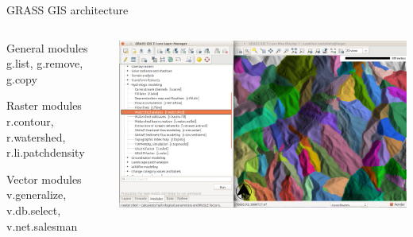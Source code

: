 \documentclass[xcolor={dvipsnames,usenames},beamer,aspectratio=169]{beamer}
\begin{document}
\begin{frame}{GRASS GIS architecture}

\begin{columns}
\begin{column}{0.4\textwidth}

\begin{block}{General modules}
g.list, g.remove, g.copy
\end{block}

\begin{block}{Raster modules}
r.contour, r.watershed, r.li.patchdensity
\end{block}

\begin{block}{Vector modules}
v.generalize, v.db.select, v.net.salesman
\end{block}

\end{column}
\begin{column}{0.45\textwidth}

\begin{center}
  \includegraphics[width=\textwidth]{grass/basins}
\end{center}

\end{column}
\end{columns}


\end{frame}
\end{document}
